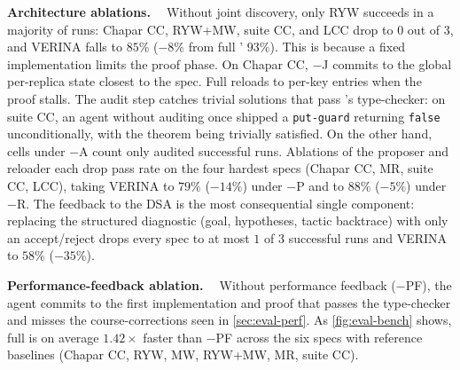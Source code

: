 \textbf{Architecture ablations. \ }
Without joint discovery, only RYW succeeds in a majority of runs: Chapar CC, RYW+MW, \sys{} suite CC, and LCC drop to $0$ out of $3$, and VERINA falls to $85\%$ ($-8\%$ from full \sys{}' $93\%$). This is because a fixed implementation limits the proof phase. On Chapar CC, $-$J commits to the global per-replica state closest to the spec. Full \sys{} reloads to per-key entries when the proof stalls. 
The audit step catches trivial solutions that pass \coq{}'s type-checker: 
on \sys{} suite CC, an agent without auditing once shipped a \texttt{put-guard} returning \texttt{false} unconditionally, with the theorem being trivially satisfied. On the other hand, cells under $-$A count only audited successful runs. 
% 
Ablations of the proposer and reloader each drop pass rate on the four hardest specs (Chapar CC, MR, \sys{} suite CC, LCC), taking VERINA to $79\%$ ($-14\%$) under $-$P and to $88\%$ ($-5\%$) under $-$R. 
% 
The \coq{} feedback to the DSA is the most consequential single component: 
replacing the structured \coq{} diagnostic (goal, hypotheses, tactic backtrace)
with only an accept/reject drops every spec to at most $1$ of $3$ successful runs and VERINA to $58\%$ ($-35\%$). 

\textbf{Performance-feedback ablation. \ }
Without performance feedback ($-$PF), the agent commits to the first implementation and proof that passes the type-checker and misses the course-corrections seen in \cref{sec:eval-perf}. 
As \cref{fig:eval-bench} shows,
full \sys{} is on average $1.42\times$ faster than $-$PF across the six specs with reference baselines (Chapar CC, RYW, MW, RYW+MW, MR, \sys{} suite CC).

